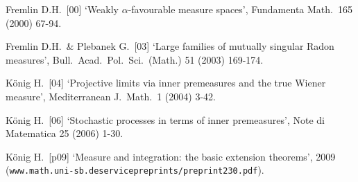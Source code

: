 Fremlin D.H.\ [00] `Weakly $\alpha$-favourable measure spaces', 
Fundamenta Math.\ 165 (2000) 67-94.
     
Fremlin D.H.\ \& Plebanek G.\ [03] `Large families of mutually singular 
Radon measures', Bull.\ Acad.\ Pol.\ Sci.\ (Math.) 51 (2003) 169-174.

K\"onig H.\ [04] `Projective limits via inner premeasures and the true 
Wiener measure', Mediterranean J.\ Math.\ 1 (2004) 3-42.

K\"onig H.\ [06] `Stochastic processes in terms of inner premeasures', 
Note di Matematica 25 (2006) 1-30.

K\"onig H.\ [p09] `Measure and integration:  the basic extension theorems',
2009 
({\tt www.math.uni-sb.de{\bsp}service{\bsp}preprints/preprint230.pdf}).


\frnewpage
